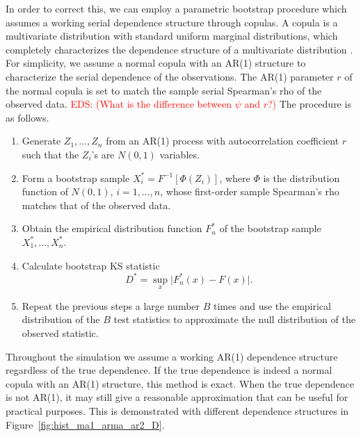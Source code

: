\documentclass[12pt, letterpaper, titlepage]{article}
\newcommand{\eds}[1]{\textcolor{red}{EDS: (#1)}}
\begin{document}
In order to correct this, we can employ a parametric bootstrap procedure which
assumes a working serial dependence structure through copulas. A copula is a
multivariate distribution with standard uniform marginal distributions, which
completely characterizes the dependence structure of a multivariate
distribution \citep{Copula, Hofert}. For simplicity, we assume a normal copula 
with an AR(1) structure to characterize the serial dependence of the 
observations. The AR(1) parameter $r$ of the normal copula is set to match the 
sample serial Spearman's rho of the observed data. 
\eds{What is the difference between $\psi$ and $r$?}
The procedure is as 
follows.
  
\begin{enumerate}
\item
  Generate $Z_1, \ldots, Z_n$ from an AR(1) process with autocorrelation
  coefficient $r$ such that the $Z_i$'s are $N(0, 1)$ variables.
\item
  Form a bootstrap sample $X_i^* = F^{-1} [\Phi(Z_i)]$, where $\Phi$ is the
  distribution function of $N(0, 1)$, $i = 1, \ldots, n$, whose first-order 
  sample Spearman's rho matches that of the observed data.
\item
  Obtain the empirical distribution function $F_n^*$ of the bootstrap sample
  $X_1^*, \ldots, X_n^*$.
\item 
  Calculate bootstrap KS statistic
  \[
    D^* = \sup_x \lvert F_n^* (x)- F(x) \rvert.
  \]
\item
  Repeat the previous steps a large number $B$ times and use the empirical
    distribution of the $B$ test statistics to approximate
    the null distribution of the observed statistic.      
\end{enumerate}

Throughout the simulation we assume a working AR(1) dependence structure 
regardless of the true dependence. If the true dependence is indeed a normal 
copula with an AR(1) structure, this method is exact. When the true dependence 
is not AR(1), it may still give a reasonable approximation that can be useful 
for practical purposes. This is demonstrated with different dependence 
structures in Figure~\ref{fig:hist_ma1_arma_ar2_D}.
\end{document}
